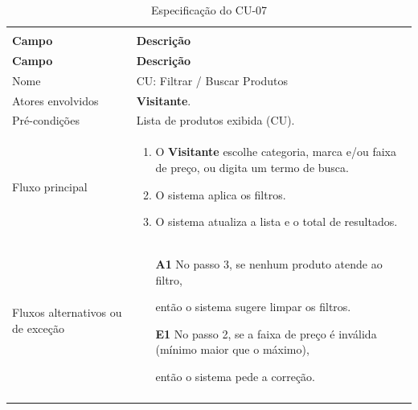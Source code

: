 \documentclass[12pt,a4paper]{article}
\begin{document}
{\setlength{\arrayrulewidth}{0.3pt}\renewcommand{\arraystretch}{1.1}\small{}
\begin{xltabular}{\textwidth}{>{\raggedright\arraybackslash}p{3.4cm}|>{\raggedright\arraybackslash}X}
\caption{Especificação do CU-07}\\
\toprule{}
\textbf{Campo} & \textbf{Descrição}\\ \midrule{}
\endfirsthead
{}\toprule{}
\textbf{Campo} & \textbf{Descrição}\\ \midrule{}
\endhead
\endlastfoot
Nome & CU: Filtrar / Buscar Produtos\\ \hline
Atores envolvidos & \textbf{Visitante}.\\ \hline
Pré-condições & Lista de produtos exibida (CU).\\ \hline
Fluxo principal & \begin{enumerate}[nosep,leftmargin=1.4em,label=\arabic*.,before=\vspace{-\baselineskip},after=\vspace{-0.4\baselineskip}]\item O \textbf{Visitante} escolhe categoria, marca e/ou faixa de preço, ou digita um termo de busca. \item O sistema aplica os filtros. \item O sistema atualiza a lista e o total de resultados. \end{enumerate}\\ \hline
Fluxos alternativos ou de exceção & \begin{itemize}[nosep,leftmargin=2.2em,labelwidth=2.2em,labelsep=0pt,align=left,itemsep=4pt,before=\vspace{-\baselineskip},after=\vspace{-0.4\baselineskip}]\item[\textbf{A1}] No passo 3, se nenhum produto atende ao filtro,\par então o sistema sugere limpar os filtros. \item[\textbf{E1}] No passo 2, se a faixa de preço é inválida (mínimo maior que o máximo),\par então o sistema pede a correção.\end{itemize}\\ \bottomrule
\end{xltabular}}
\end{document}
